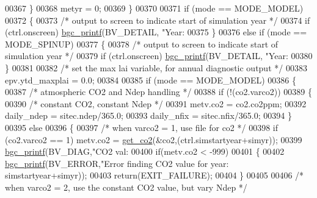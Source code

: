 \begin{DoxyCode}
00367             \}
00368             metyr = 0;
00369         \}
00370 
00371         \textcolor{keywordflow}{if} (mode == MODE\_MODEL)
00372         \{
00373             \textcolor{comment}{/* output to screen to indicate start of simulation year */}
00374             \textcolor{keywordflow}{if} (ctrl.onscreen) \hyperlink{bgc__io_8c_af287cce6e2aede1ce337de9319e80d0d}{bgc\_printf}(BV\_DETAIL, \textcolor{stringliteral}{"Year: %
00375         \}
00376         \textcolor{keywordflow}{else} \textcolor{keywordflow}{if} (mode == MODE\_SPINUP)
00377         \{
00378             \textcolor{comment}{/* output to screen to indicate start of simulation year */}
00379             \textcolor{keywordflow}{if} (ctrl.onscreen) \hyperlink{bgc__io_8c_af287cce6e2aede1ce337de9319e80d0d}{bgc\_printf}(BV\_DETAIL, \textcolor{stringliteral}{"Year: %
00380         \}
00381 
00382         \textcolor{comment}{/* set the max lai variable, for annual diagnostic output */}
00383         epv.ytd\_maxplai = 0.0;
00384         
00385         \textcolor{keywordflow}{if} (mode == MODE\_MODEL)
00386         \{
00387             \textcolor{comment}{/* atmospheric CO2 and Ndep handling */}
00388             \textcolor{keywordflow}{if} (!(co2.varco2))
00389             \{
00390                 \textcolor{comment}{/* constant CO2, constant Ndep */}
00391                 metv.co2 = co2.co2ppm;
00392                 daily\_ndep = sitec.ndep/365.0;
00393                 daily\_nfix = sitec.nfix/365.0;
00394             \}
00395             \textcolor{keywordflow}{else} 
00396             \{
00397                 \textcolor{comment}{/* when varco2 = 1, use file for co2 */}
00398                 \textcolor{keywordflow}{if} (co2.varco2 == 1) metv.co2 = \hyperlink{get__co2_8c_a90d651e65fc157ce30c88de9906e3af2}{get\_co2}(&co2,(ctrl.simstartyear+simyr));
00399                 \hyperlink{bgc__io_8c_af287cce6e2aede1ce337de9319e80d0d}{bgc\_printf}(BV\_DIAG,\textcolor{stringliteral}{"CO2 val: %
00400                 \textcolor{keywordflow}{if}(metv.co2 < -999)
00401                 \{
00402                     \hyperlink{bgc__io_8c_af287cce6e2aede1ce337de9319e80d0d}{bgc\_printf}(BV\_ERROR,\textcolor{stringliteral}{"Error finding CO2 value for year: %
      simstartyear+simyr));
00403                     \textcolor{keywordflow}{return}(EXIT\_FAILURE);
00404                 \}
00405 
00406                 \textcolor{comment}{/* when varco2 = 2, use the constant CO2 value, but vary Ndep */}
}}}}
\end{DoxyCode}
